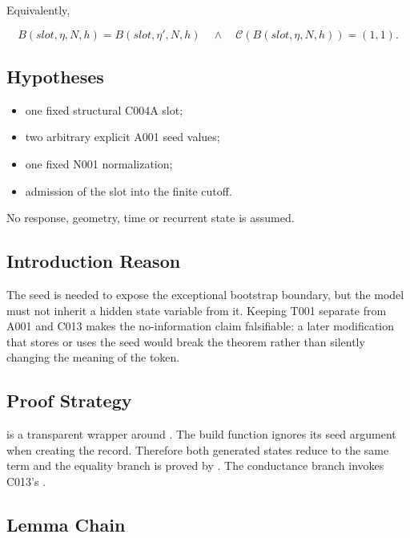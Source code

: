 Equivalently,

\[
B(slot,\eta,N,h)=B(slot,\eta',N,h)
\quad\land\quad
\mathcal C(B(slot,\eta,N,h))=(1,1).
\]

\subsection{Hypotheses}\label{hypotheses-2}

\begin{itemize}
\tightlist
\item
  one fixed structural C004A slot;
\item
  two arbitrary explicit A001 seed values;
\item
  one fixed N001 normalization;
\item
  admission of the slot into the finite cutoff.
\end{itemize}

No response, geometry, time or recurrent state is assumed.

\subsection{Introduction Reason}\label{introduction-reason-11}

The seed is needed to expose the exceptional bootstrap boundary, but the
model must not inherit a hidden state variable from it. Keeping T001
separate from A001 and C013 makes the no-information claim falsifiable:
a later modification that stores or uses the seed would break the
theorem rather than silently changing the meaning of the token.

\subsection{Proof Strategy}\label{proof-strategy-2}

\texttt{\protect{}} is a transparent wrapper around
\texttt{\protect{}}. The build function ignores its seed
argument when creating the record. Therefore both generated states
reduce to the same term and the equality branch is proved by
\texttt{\protect{}}. The conductance branch invokes C013's
\texttt{\protect{}}.

\subsection{Lemma Chain}\label{lemma-chain-2}

